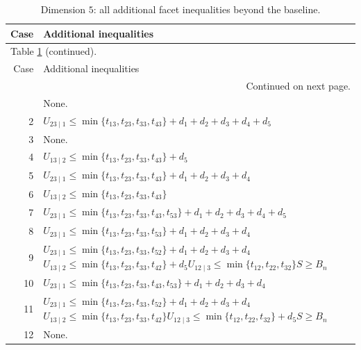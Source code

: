 \documentclass[a4paper,11pt]{amsart}
\numberwithin{equation}{section}
\theoremstyle{definition}
\theoremstyle{remark}
\begin{document}
\clearpage
{\small\setlength{\tabcolsep}{4.5pt}
\begin{longtable}{@{}r>{\raggedright\arraybackslash}p{12.9cm}@{}}
\caption{Dimension $ 5$: all additional facet inequalities beyond the baseline.}\label{tab:extras-n5}\\
\toprule
Case & Additional inequalities\\
\midrule\endfirsthead
\multicolumn{2}{l}{\small Table \ref{tab:extras-n5} (continued).}\\
\toprule
Case & Additional inequalities\\
\midrule\endhead
\midrule
\multicolumn{2}{r}{\small Continued on next page.}\\
\endfoot\bottomrule\endlastfoot
1 & None.\\[3pt]
2 & \(U_{23\mid 1}\leq \min\{t_{13},t_{23},t_{33},t_{43}\}+d_{1}+d_{2}+d_{3}+d_{4}+d_{5}\)\\[3pt]
3 & None.\\[3pt]
4 & \(U_{13\mid 2}\leq \min\{t_{13},t_{23},t_{33},t_{43}\}+d_{5}\)\\[3pt]
5 & \(U_{23\mid 1}\leq \min\{t_{13},t_{23},t_{33},t_{43}\}+d_{1}+d_{2}+d_{3}+d_{4}\)\\[3pt]
6 & \(U_{13\mid 2}\leq \min\{t_{13},t_{23},t_{33},t_{43}\}\)\\[3pt]
7 & \(U_{23\mid 1}\leq \min\{t_{13},t_{23},t_{33},t_{43},t_{53}\}+d_{1}+d_{2}+d_{3}+d_{4}+d_{5}\)\\[3pt]
8 & \(U_{23\mid 1}\leq \min\{t_{13},t_{23},t_{33},t_{53}\}+d_{1}+d_{2}+d_{3}+d_{4}\)\\[3pt]
9 & \(U_{23\mid 1}\leq \min\{t_{13},t_{23},t_{33},t_{52}\}+d_{1}+d_{2}+d_{3}+d_{4}\)\newline \(U_{13\mid 2}\leq \min\{t_{13},t_{23},t_{33},t_{42}\}+d_{5}\)\newline \(U_{12\mid 3}\leq \min\{t_{12},t_{22},t_{32}\}\)\newline \(S\geq B_n\)\\[3pt]
10 & \(U_{23\mid 1}\leq \min\{t_{13},t_{23},t_{33},t_{43},t_{53}\}+d_{1}+d_{2}+d_{3}+d_{4}\)\\[3pt]
11 & \(U_{23\mid 1}\leq \min\{t_{13},t_{23},t_{33},t_{52}\}+d_{1}+d_{2}+d_{3}+d_{4}\)\newline \(U_{13\mid 2}\leq \min\{t_{13},t_{23},t_{33},t_{42}\}\)\newline \(U_{12\mid 3}\leq \min\{t_{12},t_{22},t_{32}\}+d_{5}\)\newline \(S\geq B_n\)\\[3pt]
12 & None.\\[3pt]

\end{longtable}}
\end{document}
